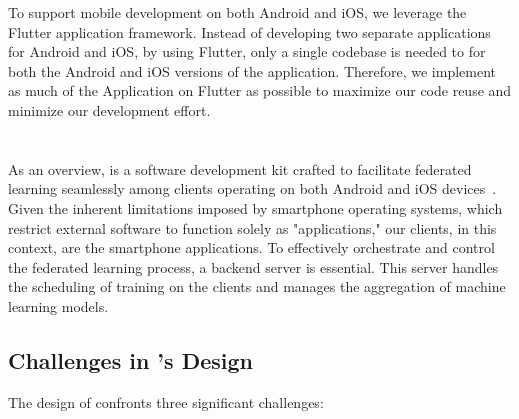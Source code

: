 To support mobile development on both Android and iOS,
we leverage the Flutter application framework.
Instead of developing two separate applications for Android and iOS,
by using Flutter,
only a single codebase is needed to for both the Android and iOS versions of
the application.
Therefore, we implement as much of the \fedcampus Application on Flutter as
possible to maximize our code reuse and minimize our development effort.

\section{\fedkit}

As an overview,
\fedkit is a software development kit crafted to facilitate federated learning
seamlessly among clients operating on both Android and iOS
devices~\cite{he2024fedkit}.
Given the inherent limitations imposed by smartphone operating systems,
which restrict external software to function solely as "applications," our
clients, in this context, are the smartphone applications.
To effectively orchestrate and control the federated learning process,
a backend server is essential.
This server handles the scheduling of training on the clients and manages the
aggregation of machine learning models.

\subsection{Challenges in \fedkit's Design}

The design of \fedkit confronts three significant challenges:

